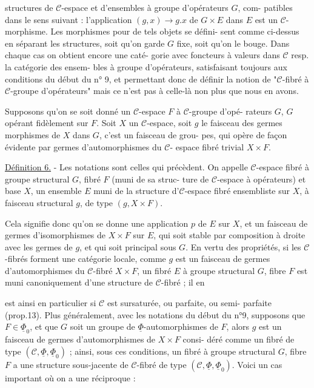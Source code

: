 structures de $\mathcal{C}$-espace et d'ensembles à groupe d'opérateurs $G$, com-
patibles dans le sens suivant : l'application $(g, x) \rightarrow g.x$ de $G \times E$ dans
$E$ est un $\mathcal{C}$-morphisme. Les morphismes pour de tels objets se défini-
sent comme ci-dessus en séparant les structures, soit qu'on garde $G$
fixe, soit qu'on le bouge. Dans chaque cas on obtient encore une caté-
gorie avec foncteurs à valeurs dans $\mathcal{C}$ resp. la catégorie des ensem-
bles à groupe d'opérateurs, satisfaisant toujours aux conditions du
début du n° 9, et permettant donc de définir la notion de "$\mathcal{C}$-fibré
à $\mathcal{C}$-groupe d'opérateurs" mais ce n'est pas à celle-là non plus que
nous en avons.

Supposons qu'on se soit donné un $\mathcal{C}$-espace $F$ à $\mathcal{C}$-groupe d'opé-
rateurs $G$, $G$ opérant fidèlement sur $F$. Soit $X$ un $\mathcal{C}$-espace, soit $g$ le
faisceau des germes morphismes de $X$ dans $G$, c'est un faisceau de grou-
pes, qui opère de façon évidente par germes d'automorphismes du $\mathcal{C}$-
espace fibré trivial $X \times F$.

\underline{Définition 6.} - Les notations sont celles qui précèdent. On appelle
$\mathcal{C}$-espace fibré à groupe structural $G$, fibré $F$ (muni de sa struc-
ture de $\mathcal{C}$-espace à opérateurs) et base $X$, un ensemble $E$ muni de la
structure d'$\mathcal{C}$-espace fibré ensembliste sur $X$, à faisceau structural $g$,
de type $(g, X \times F)$.

Cela signifie donc qu'on se donne une application $p$ de $E$ sur $X$,
et un faisceau           de germes d'isomorphismes de $X \times F$ sur $E$, qui
soit stable par composition à droite avec les germes de $g$, et qui
soit principal sous $G$. En vertu des propriétés, si les $\mathcal{C}$-fibrés
forment une catégorie locale, comme $g$ est un faisceau de germes
d'automorphismes du $\mathcal{C}$-fibré $X \times F$, un fibré $E$ à groupe structural $G$,
fibre $F$ est muni canoniquement d'une structure de $\mathcal{C}$-fibré ; il en

\newpage



est ainsi en particulier si $\mathcal{C}$ est sursaturée, ou parfaite, ou semi-
parfaite (prop.13). Plus généralement, avec les notations du début du
n°9, supposons que $F \in \underline{\Phi}_0$, et que $G$ soit un groupe de $\underline{\Phi}$-automorphismes
de $F$, alors $g$ est un faisceau de germes d'automorphismes de $X \times F$ consi-
déré comme un fibré de type $(\mathcal{C}, \underline{\Phi}, \underline{\Phi}_0)$ ; ainsi, sous ces conditions,
un fibré à groupe structural $G$, fibre $F$ a une structure sous-jacente
de $\mathcal{C}$-fibré de type $(\mathcal{C}, \underline{\Phi}, \underline{\Phi}_0)$. Voici un cas important où on a une
réciproque :


